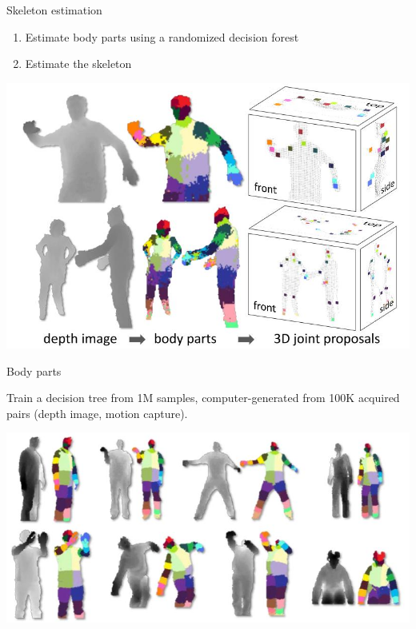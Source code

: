 \documentclass[compress]{beamer}
\begin{document}
{

\begin{frame}{Skeleton estimation}
    \begin{enumerate}
        \item Estimate body parts using a randomized decision forest
        \item Estimate the skeleton
    \end{enumerate}
    \begin{center}
        \includegraphics[width=0.8\linewidth]{skeleton/skeleton_estimation}
    \end{center}
\end{frame}
}

{

\begin{frame}{Body parts}

    Train a decision tree from \approx 1M samples, computer-generated from
    \approx 100K acquired pairs (depth image, motion capture).

    \begin{center}
        \includegraphics[width=0.8\linewidth]{skeleton/training}
    \end{center}
\end{frame}
}
\end{document}
